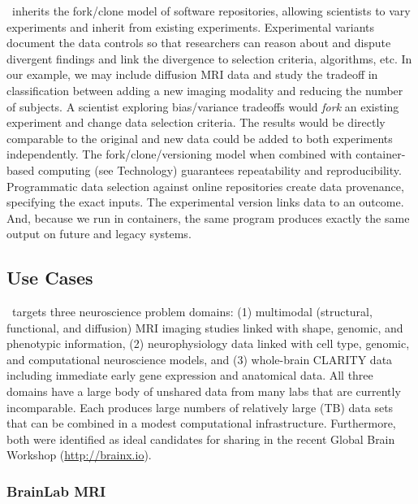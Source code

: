 \name~inherits the fork/clone model of software repositories, allowing scientists to vary experiments and inherit from existing experiments. Experimental variants document the data controls so that researchers can reason about and dispute divergent findings and link the divergence to selection criteria, algorithms, etc. In our example, we may include diffusion MRI data and study the tradeoff in classification between adding a new imaging modality and reducing the number of subjects. A scientist exploring bias/variance tradeoffs would {\em fork} an existing experiment and change data selection criteria. The results would be directly comparable to the original and new data could be added to both experiments independently.
The fork/clone/versioning model when combined with container-based computing (see Technology) guarantees repeatability and reproducibility. 
Programmatic data selection against online repositories create data provenance, specifying the exact inputs.  The experimental version links data to an outcome.  And, because we run in containers, the same program produces exactly the same output on future and legacy systems.

\subsection{Use Cases}
\label{sec:apps}

\name~targets three neuroscience problem domains: (1) multimodal (structural, functional, and diffusion) MRI imaging studies linked with shape, genomic, and phenotypic information, (2) neurophysiology data linked with cell type, genomic, and computational neuroscience models, and (3) whole-brain CLARITY data including immediate early gene expression and anatomical data.  All three domains have a large body of unshared data from many labs that are currently incomparable.  Each produces large numbers of relatively large (TB) data sets that can be combined in a modest computational infrastructure.  Furthermore, both  were identified as ideal candidates for sharing in the recent Global Brain Workshop (\url{http://brainx.io}).

\subsubsection{BrainLab MRI}

